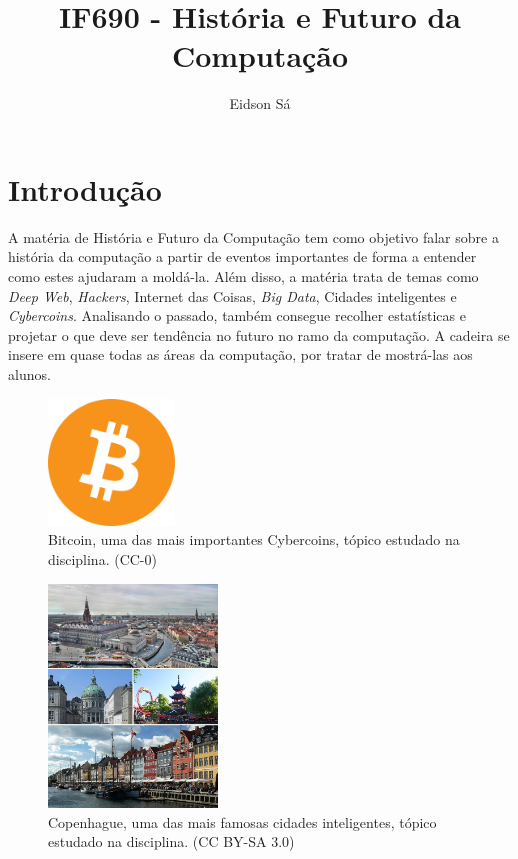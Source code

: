 \documentclass[a4paper]{article}
\title{IF690 - História e Futuro da Computação}
\author{Eidson Sá}
\date{}
\begin{document}
\maketitle

\section{Introdução}
	A matéria de História e Futuro da Computação \cite{HC:2007:CFF} tem como objetivo falar sobre a história da computação a partir de eventos importantes de forma a entender como estes ajudaram a moldá-la. Além disso, a matéria trata de temas como \textit{Deep Web}, \textit{Hackers}, Internet das Coisas, \textit{Big Data}, Cidades inteligentes e \textit{Cybercoins}. Analisando o passado, também consegue recolher estatísticas e projetar o que deve ser tendência no futuro no ramo da computação. A cadeira se insere em quase todas as áreas da computação, por tratar de mostrá-las aos alunos.

\begin{figure}[h]
\centering
\includegraphics[width=0.3\textwidth]{ejas1.png}
\caption{\label{fig:bit}Bitcoin, uma das mais importantes Cybercoins, tópico estudado na disciplina. (CC-0)}
\end{figure}

\begin{figure}[h]
\centering
\includegraphics[width=0.4\textwidth]{ejas2.jpg}
\caption{\label{fig:cop} Copenhague, uma das mais famosas cidades inteligentes, tópico estudado na disciplina. (CC BY-SA 3.0)}
\end{figure}
\end{document}
